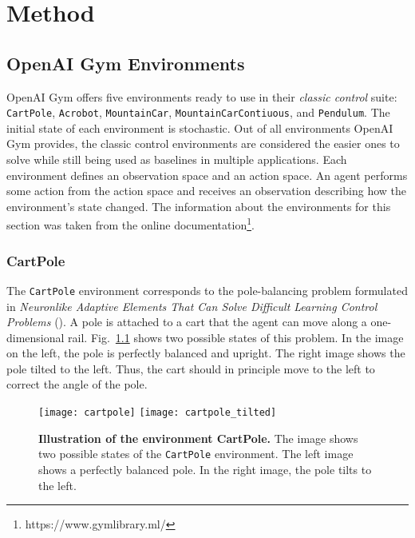 
\chapter{Method}
\label{ch:method}

\section{OpenAI Gym Environments}
\label{sec:environments}
OpenAI Gym offers five environments ready to use in their \textit{classic control} suite: \verb|CartPole|, \texttt{Acrobot}, \verb|MountainCar|, \verb|MountainCarContiuous|, and \verb|Pendulum|. The initial state of each environment is stochastic. Out of all environments OpenAI Gym provides, the classic control environments are considered the easier ones to solve while still being used as baselines in multiple applications. Each environment defines an observation space and an action space. An agent performs some action from the action space and receives an observation describing how the environment's state changed. The information about the environments for this section was taken from the online documentation\footnote{https://www.gymlibrary.ml/}.

\subsection{CartPole}
The \verb|CartPole| environment corresponds to the pole-balancing problem formulated in \emph{Neuronlike Adaptive Elements That Can Solve Difficult Learning Control Problems} (\cite{6313077}). A pole is attached to a cart that the agent can move along a one-dimensional rail. Fig.~\ref{fig:cartpole} shows two possible states of this problem. In the image on the left, the pole is perfectly balanced and upright. The right image shows the pole tilted to the left. Thus, the cart should in principle move to the left to correct the angle of the pole.
\begin{figure}[!ht]
  \centering
\texttt{[image: cartpole]} \hspace*{10mm} \texttt{[image: cartpole\_tilted]}
\caption[Illustration of the environment CartPole]{
  \textbf{Illustration of the environment CartPole.}
  The image shows two possible states of the \texttt{CartPole} environment. The left image shows a perfectly balanced pole. In the right image, the pole tilts to the left.
}
\label{fig:cartpole}
\end{figure}

